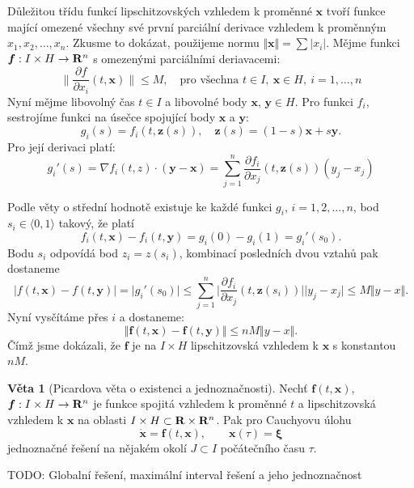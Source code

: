 \documentclass[a4paper, 12pt]{book}
\theoremstyle{definition}
\newtheorem{theorem}{Věta}[section]
\def\grad{\nabla}
\def\to{\rightarrow}
\def\Real{{\rm\bf R}}
\def\vc#1{\mathbf{\boldsymbol{#1}}}     %
\def\abs#1{\lvert#1\rvert}
\def\norm#1{\bigl\Vert#1\bigr\Vert} %
\def\prtl{\partial}                                        %
\def\todo#1{{\color{green}TODO:} #1}
\begin{document}
Důležitou třídu funkcí lipschitzovských vzhledem k proměnné $\vc x$ 
tvoří funkce mající omezené všechny své první parciální derivace vzhledem k proměnným 
$x_1, x_2, \dots, x_n$. Zkusme to dokázat, použijeme normu $\norm{\vc x} = \sum \abs{x_i}$. Mějme funkci $\vc f: I \times H \to \Real^n$
s omezenými parciálními deriavacemi:
\[
    \Big\| \frac{\prtl f}{\prtl x_i}(t, \vc x) \Big\| \le M, \quad \text{pro všechna } t\in I,\ \vc x \in H,\ i=1,\dots, n
\]
Nyní mějme libovolný čas $t\in I$ a libovolné body $\vc x,\, \vc y\in H$. Pro funkci $f_i$, sestrojíme funkci 
na úsečce spojující body $\vc x$ a $\vc y$:
\[
   g_i(s) = f_i(t, \vc z(s)),\quad \vc z(s) = (1-s) \vc x + s \vc y.
\]
Pro její derivaci platí:
\[
  g_i'(s) = \grad f_i(t, z) \cdot (\vc y - \vc x) = \sum_{j=1}^{n} \frac{\prtl f_i}{\prtl x_j}(t, \vc z(s)) (y_j - x_j)
\]


Podle věty o střední hodnotě existuje ke každé funkci $g_i$, $i=1,2,\dots,n$,
bod $s_i\in \langle 0, 1\rangle$ takový, že platí
\[
    f_i(t, \vc x)-f_i(t, \vc y)= g_i(0) - g_i(1) = g_i'(s_0).
\]
Bodu $s_i$ odpovídá bod $z_i = z(s_i)$, kombinací posledních dvou vztahů pak dostaneme
\[
  \abs{f(t, \vc x)-f(t, \vc y)} = \abs{g_i'(s_0)} \le \sum_{j=1}^{n} \Big | \frac{\prtl f_i}{\prtl x_j}(t, \vc z(s_i)) \Big | \abs{y_j - x_j} \le M\norm{y - x}.
\]
Nyní vysčítáme přes  $i$ a dostaneme:
\[
  \norm{ \vc f(t, \vc x) - \vc f(t,\vc y) } \le nM \norm{y-x}.
\]
Čímž jsme dokázali, že $\vc f$ je na $I\times H$ lipschitzovská vzhledem k $\vc x$ s konstantou $nM$.




\begin{theorem}[Picardova věta o existenci a jednoznačnosti]
\label{thm::Picard}
Nechť $\vc f(t, \vc x)$, $\vc f: I\times H \to \Real^n$ je funkce spojitá vzhledem k proměnné $t$ a lipschitzovská vzhledem k $\vc x$
na oblasti $I\times H \subset \Real \times \Real ^n$. Pak pro Cauchyovu úlohu
\begin{equation}
 \dot{\vc x}=\vc f(t,\vc x),\qquad \vc x(\tau)=\vc \xi
\end{equation}
jednoznačné řešení na nějakém okolí $J\subset I$ počátečního času $\tau$.
\end{theorem}
\todo{Globalní řešení, maximální interval řešení a jeho jednoznačnost}

\end{document}
